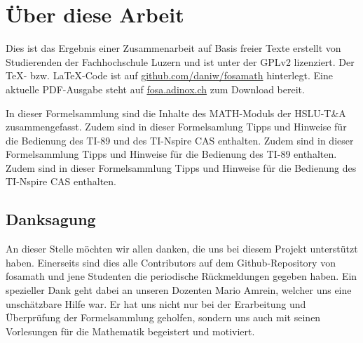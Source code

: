 



\chapter*{Über diese Arbeit}
Dies ist das Ergebnis einer Zusammenarbeit auf Basis freier Texte erstellt von Studierenden der Fachhochschule Luzern und ist unter der GPLv2 lizenziert. Der \TeX - bzw. \LaTeX -Code ist auf \url{github.com/daniw/fosamath} hinterlegt. Eine aktuelle PDF-Ausgabe steht auf \url{fosa.adinox.ch} zum Download bereit.

In dieser Formelsammlung sind die Inhalte des MATH-Moduls der HSLU-T\&A zusammengefasst.
%
\iftiboth
	Zudem sind in dieser Formelsamlung Tipps und Hinweise für die Bedienung des TI-89 und des TI-Nspire CAS enthalten. 
	\else
	\ifti
		Zudem sind in dieser Formelsammlung Tipps und Hinweise für die Bedienung des TI-89 enthalten. 
	\fi
	\ifnspire
		Zudem sind in dieser Formelsammlung Tipps und Hinweise für die Bedienung des TI-Nspire CAS enthalten. 
	\fi
\fi




\section*{Danksagung}
An dieser Stelle möchten wir allen danken, die uns bei diesem Projekt unterstützt haben.
Einerseits sind dies alle Contributors auf dem Github-Repository von fosamath und jene Studenten die
periodische Rückmeldungen gegeben haben.
Ein spezieller Dank geht dabei an unseren Dozenten Mario Amrein, welcher uns eine unschätzbare Hilfe war.
Er hat uns nicht nur bei der Erarbeitung und Überprüfung der Formelsammlung geholfen, sondern uns auch 
mit seinen Vorlesungen für die Mathematik begeistert und motiviert.


